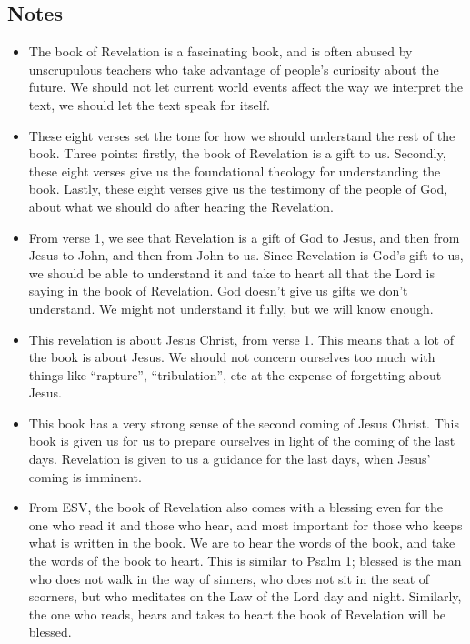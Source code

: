 \subsection*{Notes}
\begin{itemize}
  \item{The book of Revelation is a fascinating book, and is often abused by
  unscrupulous teachers who take advantage of people's curiosity about the
  future.  We should not let current world events affect the way we interpret
  the text, we should let the text speak for itself.}
  \item{These eight verses set the tone for how we should understand the rest
  of the book.  Three points: firstly, the book of Revelation is a gift to
  us.  Secondly, these eight verses give us the foundational theology for
  understanding the book.  Lastly, these eight verses give us the testimony
  of the people of God, about what we should do after hearing the
  Revelation.}
  \item{From verse 1, we see that Revelation is a gift of God to Jesus, and
  then from Jesus to John, and then from John to us.  Since Revelation is
  God's gift to us, we should be able to understand it and take to heart all
  that the Lord is saying in the book of Revelation.  God doesn't give us
  gifts we don't understand.  We might not understand it fully, but we will
  know enough.}
  \item{This revelation is about Jesus Christ, from verse 1.  This means that
  a lot of the book is about Jesus.  We should not concern ourselves too much
  with things like ``rapture'', ``tribulation'', etc at the expense of
  forgetting about Jesus.  }
  \item{This book has a very strong sense of the second coming of Jesus
  Christ.  This book is given us for us to prepare ourselves in light of the
  coming of the last days.  Revelation is given to us a guidance for the last
  days, when Jesus' coming is imminent.}
  \item{From ESV, the book of Revelation also comes with a blessing even for
  the one who read it and those who hear, and most important for those who
  keeps what is written in the book.  We are to hear the words of the book,
  and take the words of the book to heart.  This is similar to Psalm 1;
  blessed is the man who does not walk in the way of sinners, who does not
  sit in the seat of scorners, but who meditates on the Law of the Lord day
  and night.  Similarly, the one who reads, hears and takes to heart the book
  of Revelation will be blessed.}

\end{itemize}
